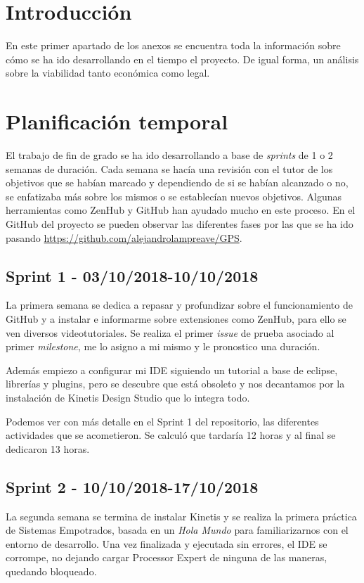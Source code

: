 
\section{Introducción}
En este primer apartado de los anexos se encuentra toda la información sobre cómo se ha ido desarrollando en el tiempo el proyecto. De igual forma, un análisis sobre la viabilidad tanto económica como legal.

\section{Planificación temporal}
El trabajo de fin de grado se ha ido desarrollando a base de \textit{sprints} de 1 o 2 semanas de duración. Cada semana se hacía una revisión con el tutor de los objetivos que se habían marcado y dependiendo de si se habían alcanzado o no, se enfatizaba más sobre los mismos o se establecían nuevos objetivos. Algunas herramientas como ZenHub y GitHub han ayudado mucho en este proceso. En el GitHub del proyecto se pueden observar las diferentes fases por las que se ha ido pasando \url{https://github.com/alejandrolampreave/GPS}.

\subsection{Sprint 1 - 03/10/2018-10/10/2018}
La primera semana se dedica a repasar y profundizar sobre el funcionamiento de GitHub y a instalar e informarme sobre extensiones como ZenHub, para ello se ven diversos videotutoriales. Se realiza el primer \textit{issue} de prueba asociado al primer \textit{milestone}, me lo asigno a mi mismo y le pronostico una duración.

Además empiezo a configurar mi IDE siguiendo un tutorial a base de eclipse, librerías y plugins, pero se descubre que está obsoleto y nos decantamos por la instalación de Kinetis Design Studio que lo integra todo.

Podemos ver con más detalle en el Sprint 1 del repositorio, las diferentes actividades que se acometieron. 
Se calculó que tardaría 12 horas y al final se dedicaron 13 horas.

\subsection{Sprint 2 - 10/10/2018-17/10/2018}
La segunda semana se termina de instalar Kinetis y se realiza la primera práctica de Sistemas Empotrados, basada en un \textit{Hola Mundo} para familiarizarnos con el entorno de desarrollo. Una vez finalizada y ejecutada sin errores, el IDE se corrompe, no dejando cargar Processor Expert de ninguna de las maneras, quedando bloqueado.

